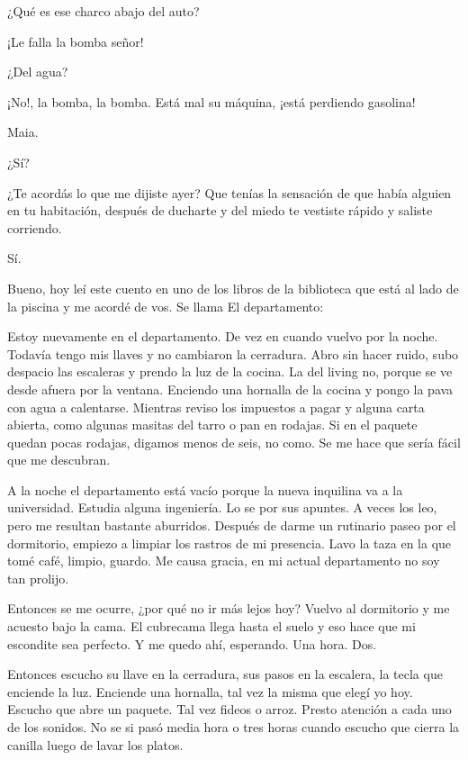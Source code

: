 \documentclass[12pt,twoside,openright,a5paper]{book}
\begin{document}
¿Qué es ese charco abajo del auto?

¡Le falla la bomba señor!

¿Del agua?

¡No!, la bomba, la bomba. Está mal su máquina, ¡está perdiendo gasolina!

\vspace{0.5cm}

\hrulefill\hspace{0.2cm} \decofourleft\decofourright \hspace{0.2cm} \hrulefill
\vspace{0.5cm}

Maia.

¿Sí?

¿Te acordás lo que me dijiste ayer? Que tenías la sensación de que había
alguien en tu habitación, después de ducharte y del miedo te vestiste
rápido y saliste corriendo.

Sí.

Bueno, hoy leí este cuento en uno de los libros de la biblioteca que está
al lado de la piscina y me acordé de vos. Se llama El departamento:

Estoy nuevamente en el departamento. De vez en cuando vuelvo por la
noche. Todavía tengo mis llaves y no cambiaron la cerradura. Abro sin hacer
ruido, subo despacio las escaleras y prendo la luz de la cocina. La del
living no, porque se ve desde afuera por la ventana. Enciendo una hornalla
de la cocina y pongo la pava con agua a calentarse. Mientras reviso los
impuestos a pagar y alguna carta abierta, como algunas masitas del tarro
o pan en rodajas. Si en el paquete quedan pocas rodajas, digamos menos de
seis, no como. Se me hace que sería fácil que me descubran.

A la noche el departamento está vacío porque la nueva inquilina va a la
universidad. Estudia alguna ingeniería. Lo se por sus apuntes. A veces los
leo, pero me resultan bastante aburridos. Después de darme un rutinario
paseo por el dormitorio, empiezo a limpiar los rastros de mi presencia. Lavo
la taza en la que tomé café, limpio, guardo. Me causa gracia, en mi
actual departamento no soy tan prolijo.

Entonces se me ocurre, ¿por qué no ir más lejos hoy? Vuelvo al dormitorio
y me acuesto bajo la cama. El cubrecama llega hasta el suelo y eso hace
que mi escondite sea perfecto. Y me quedo ahí, esperando. Una hora. Dos.

Entonces escucho su llave en la cerradura, sus pasos en la escalera, la tecla
que enciende la luz. Enciende una hornalla, tal vez la misma que elegí yo
hoy. Escucho que abre un paquete. Tal vez fideos o arroz. Presto atención
a cada uno de los sonidos. No se si pasó media hora o tres horas cuando
escucho que cierra la canilla luego de lavar los platos.
\end{document}

